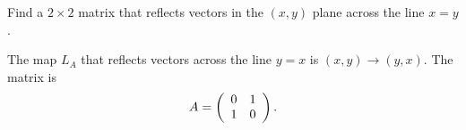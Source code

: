 \documentclass{ximera}
\begin{document}
\begin{exercise} \label{c4.2.2c}
Find a $2\times 2$ matrix that reflects vectors in the $(x,y)$ plane across
the line $x=y$.

\begin{solution}
The map $L_A$ that reflects vectors across the line $y=x$ is
$(x,y) \rightarrow (y,x)$.  The matrix is
\[
A = \left(\begin{array}{rr} 0 & 1\\ 1 &0\end{array}\right).
\]

\end{solution}
\end{exercise}
\end{document}

